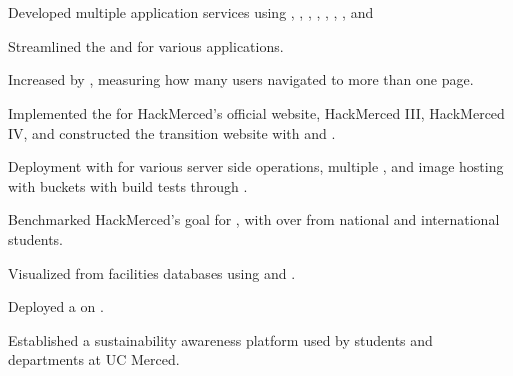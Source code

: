 \documentclass[]{hackathons}
\begin{document}
\begin{minipage}[t]{0.66\textwidth} 


\section{} 

\vspace{\topsep} %
\begin{tightemize}
\item Developed multiple application services using , , , , , , , and 
\item Streamlined the  and  for various applications.
\item Increased  by , measuring how many users navigated to more than one page.
\end{tightemize}
\medskip

\begin{tightemize}
\item Implemented the  for HackMerced's official website, HackMerced III, HackMerced IV, and constructed the transition website with  and .
\item Deployment with  for various server side operations, multiple , and image hosting with  buckets with build tests through .
\item Benchmarked HackMerced's goal for , with over  from national and international students.
\end{tightemize}
\medskip

\begin{tightemize}
\item Visualized  from facilities databases using  and .
\item Deployed a  on .
\item Established a sustainability awareness platform used by  students and  departments at UC Merced.
\end{tightemize}
\medskip


\end{minipage}
\end{document}
